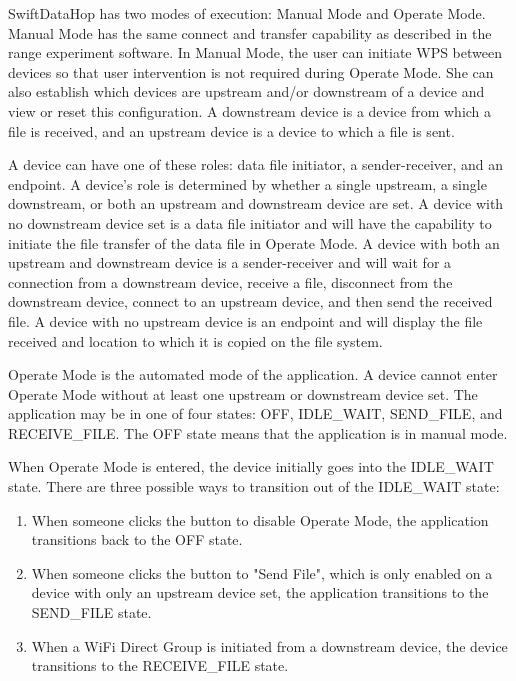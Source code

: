 \documentclass[10pt,twocolumn]{article}
\begin{document}
SwiftDataHop has two modes of execution: Manual Mode and Operate Mode.
Manual Mode has the same connect and transfer capability as described in the range experiment software.
In Manual Mode, the user can initiate WPS between devices so that user intervention is not required during Operate Mode.
She can also establish which devices are upstream and/or downstream of a device and view or reset this configuration.
A downstream device is a device from which a file is received, and an upstream device is a device to which a file is sent.

A device can have one of these roles: data file initiator, a sender-receiver, and an endpoint.
A device's role is determined by whether a single upstream, a single downstream, or both an upstream and downstream device are set.
A device with no downstream device set is a data file initiator and will have the capability to initiate the file transfer of the data file in Operate Mode.
A device with both an upstream and downstream device is a sender-receiver and will wait for a connection from a downstream device, receive a file, disconnect from the downstream device, connect to an upstream device, and then send the received file.
A device with no upstream device is an endpoint and will display the file received and location to which it is copied on the file system.

Operate Mode is the automated mode of the application.
A device cannot enter Operate Mode without at least one upstream or downstream device set.
The application may be in one of four states: OFF, IDLE\_WAIT, SEND\_FILE, and RECEIVE\_FILE.
The OFF state means that the application is in manual mode.

When Operate Mode is entered, the device initially goes into the IDLE\_WAIT state.
There are three possible ways to transition out of the IDLE\_WAIT state:
\begin{enumerate}
  \item When someone clicks the button to disable Operate Mode, the application transitions back to the OFF state.
  \item When someone clicks the button to "Send File", which is only enabled on a device with only an upstream device set, the application transitions to the SEND\_FILE state.
  \item When a WiFi Direct Group is initiated from a downstream device, the device transitions to the RECEIVE\_FILE state.
\end{enumerate}
\end{document}
